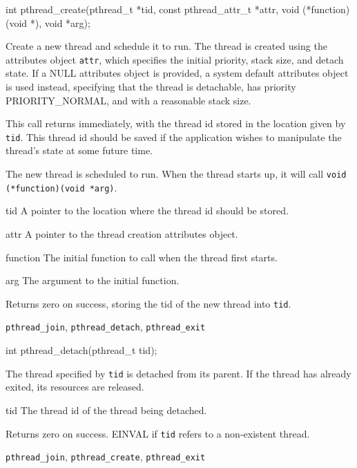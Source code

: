 \begin{apisyn}

	\funcproto int pthread_create(pthread_t *tid,
                                      const pthread_attr_t *attr,
				      void (*function)(void *), void *arg);
\end{apisyn}
\begin{apidesc}
	Create a new thread and schedule it to run. The thread is created
	using the attributes object {\tt attr}, which specifies the initial
	priority, stack size, and detach state. If a NULL attributes
	object is provided, a system default attributes object is used
	instead, specifying that the thread is detachable, has priority
	PRIORITY_NORMAL, and with a reasonable stack size. 

	This call returns immediately, with the thread id stored in the
	location given by {\tt tid}. This thread id should be saved if the
	application wishes to manipulate the thread's state at some future
	time.

	The new thread is scheduled to run. When the thread starts up, it
	will call {\tt void (*function)(void *arg)}.
\end{apidesc}
\begin{apiparm}
	\item[tid]
		A pointer to the location where the thread id should be
		stored. 
	\item[attr]
		A pointer to the thread creation attributes object.
	\item[function]
		The initial function to call when the thread first starts.
	\item[arg]
		The argument to the initial function.
\end{apiparm}
\begin{apiret}
	Returns zero on success, storing the tid of the new thread into
	{\tt *tid}.
\end{apiret}
\begin{apirel}
	{\tt pthread_join}, {\tt pthread_detach}, {\tt pthread_exit}
\end{apirel}


\begin{apisyn}

	\funcproto int pthread_detach(pthread_t tid);
\end{apisyn}
\begin{apidesc}
	The thread specified by {\tt tid} is detached from its parent. If
	the thread has already exited, its resources are released.
\end{apidesc}
\begin{apiparm}
	\item[tid]
		The thread id of the thread being detached.
\end{apiparm}
\begin{apiret}
	Returns zero on success. EINVAL if {\tt tid} refers to a
	non-existent thread.
\end{apiret}
\begin{apirel}
	{\tt pthread_join}, {\tt pthread_create}, {\tt pthread_exit}
\end{apirel}


